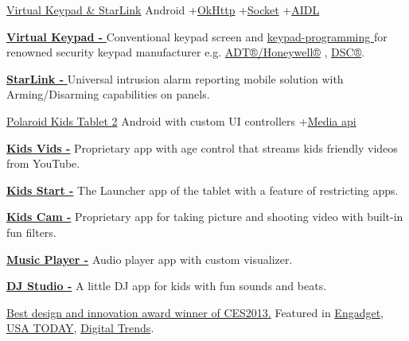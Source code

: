 \begin{projectentries}
    
    \projectentry 
    {\href{https://www.youtube.com/watch?v=_UDmZebYkEY}{Virtual Keypad \& StarLink} }
    {Android
    +{\href{http://square.github.io/okhttp/}{OkHttp}}
    +{\href{https://www.geeksforgeeks.org/socket-programming-in-java/}{Socket}}
    +{\href{https://developer.android.com/guide/components/aidl}{AIDL}}}
    {
      \begin{projectitems} %
        \item {\href{https://youtu.be/_UDmZebYkEY?t=24}{\textbf{Virtual Keypad - }}
        Conventional keypad screen and 
        {\href{https://www.youtube.com/watch?v=Y1s-n1bF5G4}{keypad-programming }}
        for renowned security keypad manufacturer e.g. 
        {\href{https://www.security.honeywell.com/product-repository/6160v}{ADT®/Honeywell®}}
        , {\href{http://www.dsc.com/index.php?n=products&o=view&id=60}{DSC®}}.}
        \item {\href{https://youtu.be/_UDmZebYkEY?t=70}{\textbf{StarLink - }}
        Universal intrusion alarm reporting mobile solution with Arming/Disarming capabilities on panels.}
      \end{projectitems}
    }

    \projectentry 
    {\href{https://www.polaroid.com/kids-tablet-2}{Polaroid Kids Tablet 2}} 
    {Android with custom UI controllers
    +{\href{https://developer.android.com/guide/topics/media/}{Media api}}}
    {
      \begin{projectitems} %
        \item {\href{https://youtu.be/7bRafa1btPA?t=94}{\textbf{Kids Vids -}} 
        Proprietary app with age control that streams kids friendly videos from YouTube.}
        \item {\href{https://youtu.be/7bRafa1btPA?t=7}{\textbf{Kids Start -}} 
        The Launcher app of the tablet with a feature of restricting apps.}
        \item {\href{https://youtu.be/7bRafa1btPA?t=120}{\textbf{Kids Cam -}} 
        Proprietary app for taking picture and shooting video with built-in fun filters.}
        \item {\href{https://youtu.be/7bRafa1btPA?t=146}{\textbf{Music Player -}} 
        Audio player app with custom visualizer.}
        \item {\href{https://youtu.be/7bRafa1btPA?t=146}{\textbf{DJ Studio -}} 
        A little DJ app for kids with fun sounds and beats.}
        \item {\href{https://www.androidauthority.com/polaroid-kids-tablet-149-99-144498/}{Best design and innovation award winner of CES2013.}
        Featured in
        {\href{https://www.engadget.com/2013/11/06/polaroid-kids-tablet-2/}{Engadget}, }
        {\href{https://www.usatoday.com/story/dispatches/2013/12/17/family-travel-gifts/4038309/}{USA TODAY}, }
        {\href{https://www.youtube.com/watch?v=WqLu0ru4xO8}{Digital Trends}.}
        }
      \end{projectitems}
    }


\end{projectentries}
